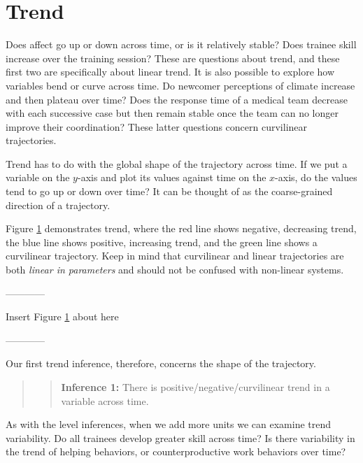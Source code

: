 \documentclass[english,,man]{apa6}
\theoremstyle{definition}
\theoremstyle{definition}
\theoremstyle{definition}
\theoremstyle{remark}
\begin{document}
\hypertarget{trend}{%
\section{Trend}\label{trend}}

Does affect go up or down across time, or is it relatively stable? Does
trainee skill increase over the training session? These are questions
about trend, and these first two are specifically about linear trend. It
is also possible to explore how variables bend or curve across time. Do
newcomer perceptions of climate increase and then plateau over time?
Does the response time of a medical team decrease with each successive
case but then remain stable once the team can no longer improve their
coordination? These latter questions concern curvilinear trajectories.

Trend has to do with the global shape of the trajectory across time. If
we put a variable on the \(y\)-axis and plot its values against time on
the \(x\)-axis, do the values tend to go up or down over time? It can be
thought of as the coarse-grained direction of a trajectory.

Figure \ref{trend} demonstrates trend, where the red line shows
negative, decreasing trend, the blue line shows positive, increasing
trend, and the green line shows a curvilinear trajectory. Keep in mind
that curvilinear and linear trajectories are both \emph{linear in
parameters} and should not be confused with non-linear systems.

\begin{center}

------------

Insert Figure \ref{trend} about here

------------

\end{center}

Our first trend inference, therefore, concerns the shape of the
trajectory.

\begin{quote}
\begin{quote}
\textbf{Inference 1:} There is positive/negative/curvilinear trend in a
variable across time.
\end{quote}
\end{quote}

As with the level inferences, when we add more units we can examine
trend variability. Do all trainees develop greater skill across time? Is
there variability in the trend of helping behaviors, or
counterproductive work behaviors over time?
\end{document}
